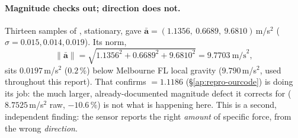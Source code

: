 \paragraph{Magnitude checks out; direction does not.} Thirteen samples of
, stationary, gave
$\bar{\mathbf{a}} = (1.1356,\ 0.6689,\ 9.6810)$\,m/s$^2$
($\sigma = 0.015, 0.014, 0.019$). Its norm,
\begin{equation}
\lVert\bar{\mathbf{a}}\rVert = \sqrt{1.1356^2+0.6689^2+9.6810^2}
 = 9.7703\ \text{m/s}^2,
\label{eq:accnorm}
\end{equation}
sits $0.0197$\,m/s$^2$ ($0.2\,\%$) below Melbourne FL local gravity
($9.790$\,m/s$^2$, used throughout this report). That confirms
$=1.1186$ (\S\ref{ap:repro-ourcode}) is doing its job: the
much larger, already-documented magnitude defect it corrects for
($8.7525$\,m/s$^2$ raw, $-10.6\,\%$) is not what is happening here. This is a
second, independent finding: the sensor reports the right \emph{amount} of
specific force, from the wrong \emph{direction}.

